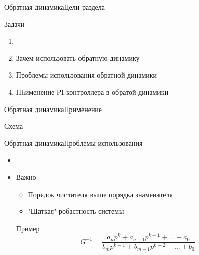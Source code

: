 \begin{frame}{Обратная динамика}{Цели раздела}
    \begin{block}{Задачи}
        \begin{enumerate}
            \item <+-> []
            \item <+-> Зачем использовать обратную динамику 
            \item <+-> Проблемы использования обратной динамики
            \item <+-> Пhименение PI-контроллера в обратой динамики
        \end{enumerate}
    \end{block}
\end{frame}

\begin{frame}{Обратная динамика}{Применение}
    \begin{block}{Схема}
    \end{block}
\end{frame}

\begin{frame}{Обратная динамика}{Проблемы использования}
    \begin{itemize}
        \item <+-> []
        \item <+-> [] \begin{block}{Важно}
            \begin{itemize}
                \item Порядок числителя выше порядка знаменателя 
                \item "Шаткая" робастность системы
            \end{itemize}
        \end{block}
        \begin{exampleblock}{Пример}
            $$G^{-1} = \frac{a_n p^k + a_{n-1} p^{k-1} + ... + a_0}{b_m p^{k-1} + b_{m-1} p^{k-2} + ... + b_0}$$
        \end{exampleblock}
    \end{itemize}
\end{frame}

